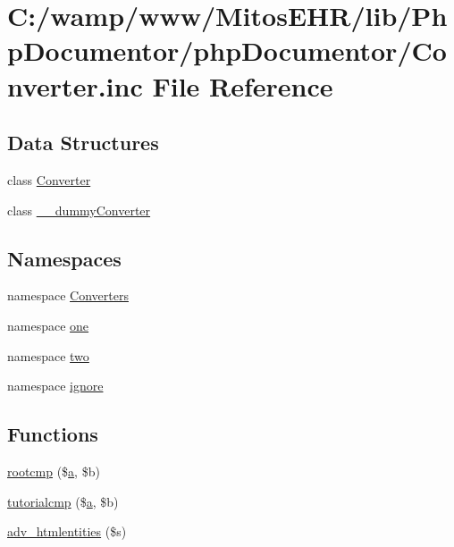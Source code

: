 \hypertarget{_converter_8inc}{\section{\-C\-:/wamp/www/\-Mitos\-E\-H\-R/lib/\-Php\-Documentor/php\-Documentor/\-Converter.inc \-File \-Reference}
\label{_converter_8inc}
}
\subsection*{\-Data \-Structures}
\begin{DoxyCompactItemize}
\item 
class \hyperlink{class_converter}{\-Converter}
\item 
class \hyperlink{class____dummy_converter}{\-\_\-\-\_\-dummy\-Converter}
\end{DoxyCompactItemize}
\subsection*{\-Namespaces}
\begin{DoxyCompactItemize}
\item 
namespace \hyperlink{namespace_converters}{\-Converters}
\item 
namespace \hyperlink{namespaceone}{one}
\item 
namespace \hyperlink{namespacetwo}{two}
\item 
namespace \hyperlink{namespaceignore}{ignore}
\end{DoxyCompactItemize}
\subsection*{\-Functions}
\begin{DoxyCompactItemize}
\item 
\hyperlink{_converter_8inc_a37d0022f58e72b954eb4b1ea499f7f73}{rootcmp} (\$\hyperlink{classa}{a}, \$b)
\item 
\hyperlink{_converter_8inc_a53db9016b4e13099425d593e36c0142a}{tutorialcmp} (\$\hyperlink{classa}{a}, \$b)
\item 
\hyperlink{_converter_8inc_ad6937ec0fb795ad86c6441bacb83bf2a}{adv\-\_\-htmlentities} (\$s)
\end{DoxyCompactItemize}


